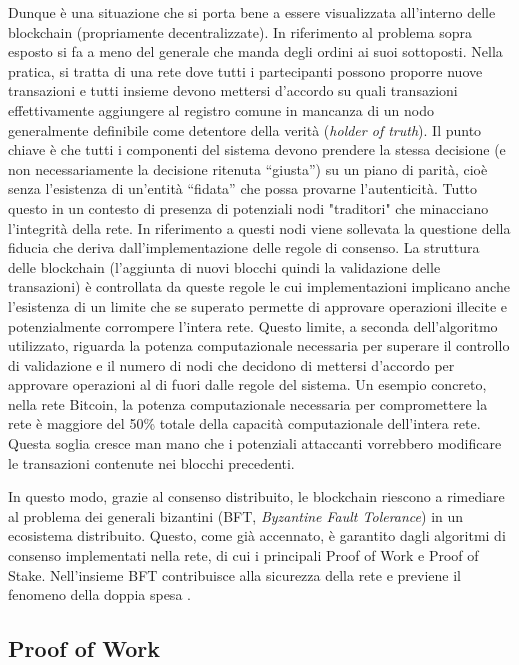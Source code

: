 Dunque è una situazione che si porta bene a essere visualizzata all'interno delle blockchain (propriamente decentralizzate). In riferimento al problema sopra esposto si fa a meno del generale che manda degli ordini ai suoi sottoposti. Nella pratica, si tratta di una rete dove tutti i partecipanti possono proporre nuove transazioni e tutti insieme devono mettersi d'accordo su quali transazioni effettivamente aggiungere al registro comune in mancanza di un nodo generalmente definibile come detentore della verità (\emph{holder of truth}). Il punto chiave è che tutti i componenti del sistema devono prendere la stessa decisione (e non necessariamente la decisione ritenuta “giusta”) su un piano di parità, cioè senza l’esistenza di un’entità “fidata” che possa provarne l’autenticità. Tutto questo in un contesto di presenza di potenziali nodi "traditori" che minacciano l'integrità della rete. In riferimento a questi nodi viene sollevata la questione della fiducia che deriva dall'implementazione delle regole di consenso. La struttura delle blockchain (l’aggiunta di nuovi blocchi quindi la validazione delle transazioni) è controllata da queste regole le cui implementazioni implicano anche l'esistenza di un limite che se superato permette di approvare operazioni illecite e potenzialmente corrompere l'intera rete. Questo limite, a seconda dell’algoritmo utilizzato, riguarda la potenza computazionale necessaria per superare il controllo di validazione e il numero di nodi che decidono di mettersi d'accordo per approvare operazioni al di fuori dalle regole del sistema. Un esempio concreto, nella rete Bitcoin, la potenza computazionale necessaria per compromettere la rete è maggiore del 50\% totale della capacità computazionale dell’intera rete. Questa soglia cresce man mano che i potenziali attaccanti vorrebbero modificare le transazioni contenute nei blocchi precedenti.

In questo modo, grazie al consenso distribuito, le blockchain riescono a rimediare al problema dei generali bizantini (BFT, \emph{Byzantine Fault Tolerance}) in un ecosistema distribuito. Questo, come già accennato, è garantito dagli algoritmi di consenso implementati nella rete, di cui i principali Proof of Work e Proof of Stake. Nell’insieme BFT contribuisce alla sicurezza della rete e previene il fenomeno della doppia spesa .


\subsection{Proof of Work}

